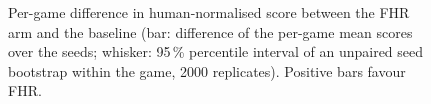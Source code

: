 \begin{figure}[t]
  \centering
  
  \caption{Per-game difference in human-normalised score between the FHR arm and the baseline (bar: difference of the per-game mean scores over the seeds; whisker: 95\,\% percentile interval of an unpaired seed bootstrap within the game, 2000 replicates). Positive bars favour FHR.}
  \label{fig:atari100k-delta-hns}
\end{figure}
